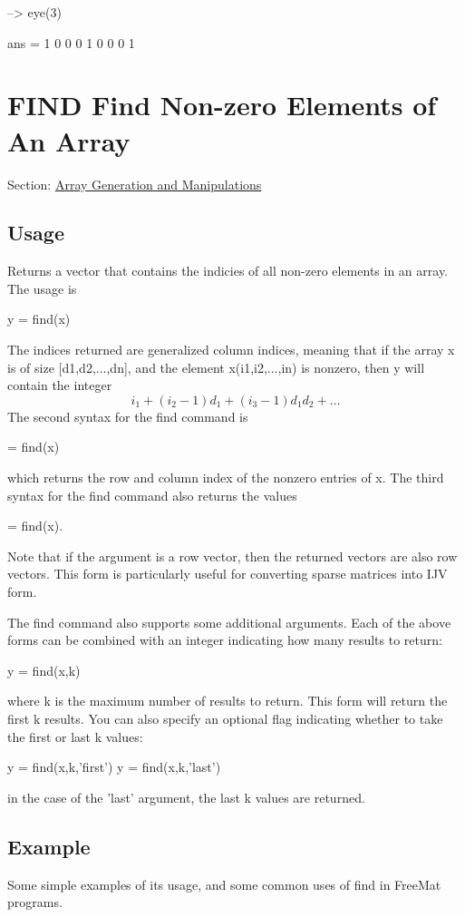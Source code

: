 \begin{DoxyVerbInclude}
--> eye(3)

ans = 
 1 0 0 
 0 1 0 
 0 0 1 
\end{DoxyVerbInclude}
 \hypertarget{array_find}{}\section{F\-I\-N\-D Find Non-\/zero Elements of An Array}\label{array_find}
Section\-: \hyperlink{sec_array}{Array Generation and Manipulations} \hypertarget{vtkwidgets_vtkxyplotwidget_Usage}{}\subsection{Usage}\label{vtkwidgets_vtkxyplotwidget_Usage}
Returns a vector that contains the indicies of all non-\/zero elements in an array. The usage is \begin{DoxyVerb}   y = find(x)
\end{DoxyVerb}
 The indices returned are generalized column indices, meaning that if the array {\ttfamily x} is of size {\ttfamily \mbox{[}d1,d2,...,dn\mbox{]}}, and the element {\ttfamily x(i1,i2,...,in)} is nonzero, then {\ttfamily y} will contain the integer \[ i_1 + (i_2-1) d_1 + (i_3-1) d_1 d_2 + \dots \] The second syntax for the {\ttfamily find} command is \begin{DoxyVerb}   [r,c] = find(x)
\end{DoxyVerb}
 which returns the row and column index of the nonzero entries of {\ttfamily x}. The third syntax for the {\ttfamily find} command also returns the values \begin{DoxyVerb}   [r,c,v] = find(x).
\end{DoxyVerb}
 Note that if the argument is a row vector, then the returned vectors are also row vectors. This form is particularly useful for converting sparse matrices into I\-J\-V form.

The {\ttfamily find} command also supports some additional arguments. Each of the above forms can be combined with an integer indicating how many results to return\-: \begin{DoxyVerb}   y = find(x,k)
\end{DoxyVerb}
 where {\ttfamily k} is the maximum number of results to return. This form will return the first {\ttfamily k} results. You can also specify an optional flag indicating whether to take the first or last {\ttfamily k} values\-: \begin{DoxyVerb}   y = find(x,k,'first')
   y = find(x,k,'last')
\end{DoxyVerb}
 in the case of the {\ttfamily 'last'} argument, the last {\ttfamily k} values are returned. \hypertarget{variables_struct_Example}{}\subsection{Example}\label{variables_struct_Example}
Some simple examples of its usage, and some common uses of {\ttfamily find} in Free\-Mat programs.



